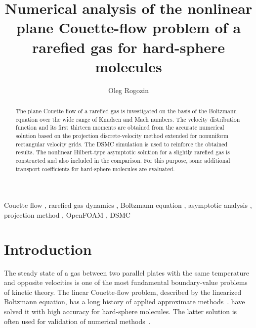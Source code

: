 \documentclass[review]{elsarticle}
\begin{document}
\begin{frontmatter}

\title{
    Numerical analysis of the nonlinear plane Couette-flow problem of a rarefied gas for hard-sphere molecules
}

\author{Oleg Rogozin}
\address{
    Moscow Institute of Physics and Technology,
    9 Institutskiy pereulok, Dolgoprudny,
    Moskovskaya obl., Russian Federation
}

\begin{keyword}
   Couette flow \sep
   rarefied gas dynamics \sep
   Boltzmann equation \sep
   asymptotic analysis \sep
   projection method \sep
   OpenFOAM \sep
   DSMC
\end{keyword}


\begin{abstract}
    The plane Couette flow of a rarefied gas is investigated on the basis of the Boltzmann equation
    over the wide range of Knudsen and Mach numbers.
    The velocity distribution function and its first thirteen moments are obtained from
    the accurate numerical solution based on the projection discrete-velocity method
    extended for nonuniform rectangular velocity grids.
    The DSMC simulation is used to reinforce the obtained results.
    The nonlinear Hilbert-type asymptotic solution for a slightly rarefied gas
    is constructed and also included in the comparison.
    For this purpose, some additional transport coefficients for hard-sphere molecules are evaluated.
\end{abstract}

\end{frontmatter}

\renewcommand*{\appendixname}{}
\tableofcontents

\linenumbers

\section{Introduction}

The steady state of a gas between two parallel plates with the same temperature
and opposite velocities is one of the most fundamental boundary-value problems of kinetic theory.
The linear Couette-flow problem, described by the linearized Boltzmann equation,
has a long history of applied approximate methods~\citep{Willis1962}.
\citet{Ohwada1990} have solved it with high accuracy for hard-sphere molecules.
The latter solution is often used for validation of numerical methods~\citep[see e.g.][]{Fan2001,Aidun2010}.
\end{document}
